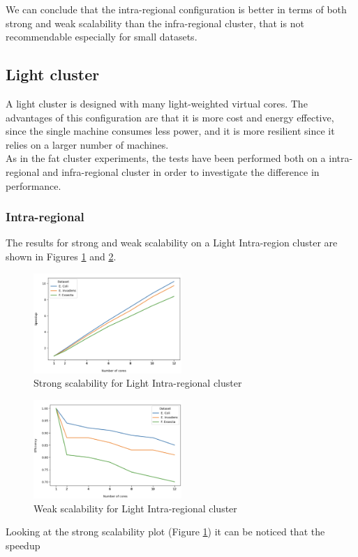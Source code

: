 \documentclass[final,5p,times,twocolumn,authoryear]{elsarticle}
\begin{document}
We can conclude that the intra-regional configuration is better in terms of both strong and weak scalability than the infra-regional cluster, that is not recommendable especially for small datasets.

\subsection{Light cluster}
A light cluster is designed with many light-weighted virtual cores. The advantages of this configuration are that it is more cost and energy effective, since the single machine consumes less power, and it is more resilient since it relies on a larger number of machines. \\
As in the fat cluster experiments, the tests have been performed both on a intra-regional and infra-regional cluster in order to investigate the difference in performance. 

\subsubsection{Intra-regional}
The results for strong and weak scalability on a Light Intra-region cluster are shown in Figures \ref{fig:light-intra-strong} and \ref{fig:light-intra-weak}. \\
\begin{figure}
    \centering
    \includegraphics[width=0.5\textwidth]{images/light_intra_strong.png}
    \caption{Strong scalability for Light Intra-regional cluster }
    \label{fig:light-intra-strong}
\end{figure}
\begin{figure}
    \centering
    \includegraphics[width=0.5\textwidth]{images/light_intra_weak.png}
    \caption{Weak scalability for Light Intra-regional cluster }
    \label{fig:light-intra-weak}
\end{figure}
Looking at the strong scalability plot (Figure \ref{fig:light-intra-strong}) it can be noticed that the speedup
\end{document}
